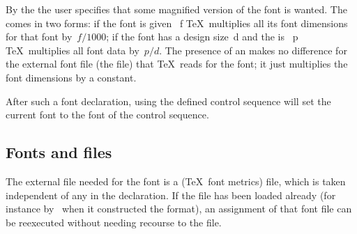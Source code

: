 \documentclass{book}
\begin{document}
By the  the user specifies that some
magnified version of the font is wanted. The  comes
in two forms: if the font is given ~{\italic f\/} \TeX\
multiplies all its font dimensions for that font by~$f/1000$;
if the font
has a design size~{\italic d\/} and
the  is ~{\italic p\/}
\TeX\ multiplies all font data by~$p/d$.
The presence of an  makes no difference for
the external font file (the  file)
that \TeX\ reads for the font; it just multiplies
the font dimensions by a constant.


After such a font declaration, using the defined control sequence
will set the current font to the font of the
control sequence.

\subsection{Fonts and \n{tfm} files}

The external file needed for the font is a \n{tfm}
(\TeX\ font metrics) file,
which is taken independent of any  
in the  declaration. If the 
file has been loaded already (for instance by \IniTeX\
when it constructed the format),
an assignment of that font file can be reexecuted
without needing recourse to the  file.
\end{document}
